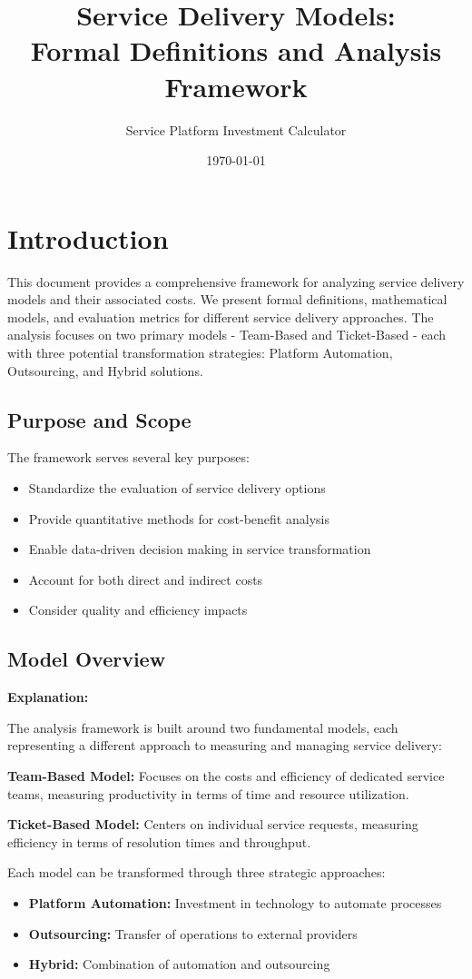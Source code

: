 \documentclass[12pt,a4paper]{article}
\title{\textbf{Service Delivery Models:\\Formal Definitions and Analysis Framework}}
\author{Service Platform Investment Calculator}
\date{\today}
\newenvironment{explanation}
{\begin{mdframed}[style=explanationstyle]
\textbf{Explanation:}\par}
{\end{mdframed}}
\begin{document}
\maketitle
\thispagestyle{empty}
\tableofcontents
\clearpage

\section{Introduction}
This document provides a comprehensive framework for analyzing service delivery models and their associated costs. We present formal definitions, mathematical models, and evaluation metrics for different service delivery approaches. The analysis focuses on two primary models - Team-Based and Ticket-Based - each with three potential transformation strategies: Platform Automation, Outsourcing, and Hybrid solutions.

\subsection{Purpose and Scope}
The framework serves several key purposes:
\begin{itemize}
    \item Standardize the evaluation of service delivery options
    \item Provide quantitative methods for cost-benefit analysis
    \item Enable data-driven decision making in service transformation
    \item Account for both direct and indirect costs
    \item Consider quality and efficiency impacts
\end{itemize}

\subsection{Model Overview}
\begin{explanation}
The analysis framework is built around two fundamental models, each representing a different approach to measuring and managing service delivery:

\textbf{Team-Based Model:} Focuses on the costs and efficiency of dedicated service teams, measuring productivity in terms of time and resource utilization.

\textbf{Ticket-Based Model:} Centers on individual service requests, measuring efficiency in terms of resolution times and throughput.

Each model can be transformed through three strategic approaches:
\begin{itemize}
    \item \textbf{Platform Automation:} Investment in technology to automate processes
    \item \textbf{Outsourcing:} Transfer of operations to external providers
    \item \textbf{Hybrid:} Combination of automation and outsourcing
\end{itemize}
\end{explanation}
\end{document}
